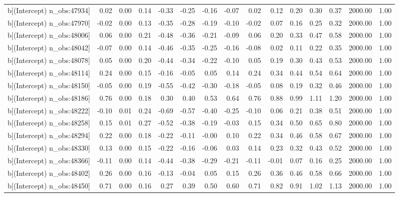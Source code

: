 \begin{table}[ht]
\begin{tabular}{rrrrrrrrrrrrrrr}
  b[(Intercept) n\_obs:47934] & 0.02 & 0.00 & 0.14 & -0.33 & -0.25 & -0.16 & -0.07 & 0.02 & 0.12 & 0.20 & 0.30 & 0.37 & 2000.00 & 1.00 \\ 
  b[(Intercept) n\_obs:47970] & -0.02 & 0.00 & 0.13 & -0.35 & -0.28 & -0.19 & -0.10 & -0.02 & 0.07 & 0.16 & 0.25 & 0.32 & 2000.00 & 1.00 \\ 
  b[(Intercept) n\_obs:48006] & 0.06 & 0.00 & 0.21 & -0.48 & -0.36 & -0.21 & -0.09 & 0.06 & 0.20 & 0.33 & 0.47 & 0.58 & 2000.00 & 1.00 \\ 
  b[(Intercept) n\_obs:48042] & -0.07 & 0.00 & 0.14 & -0.46 & -0.35 & -0.25 & -0.16 & -0.08 & 0.02 & 0.11 & 0.22 & 0.35 & 2000.00 & 1.00 \\ 
  b[(Intercept) n\_obs:48078] & 0.05 & 0.00 & 0.20 & -0.44 & -0.34 & -0.22 & -0.10 & 0.05 & 0.19 & 0.30 & 0.43 & 0.53 & 2000.00 & 1.00 \\ 
  b[(Intercept) n\_obs:48114] & 0.24 & 0.00 & 0.15 & -0.16 & -0.05 & 0.05 & 0.14 & 0.24 & 0.34 & 0.44 & 0.54 & 0.64 & 2000.00 & 1.00 \\ 
  b[(Intercept) n\_obs:48150] & -0.05 & 0.00 & 0.19 & -0.55 & -0.42 & -0.30 & -0.18 & -0.05 & 0.08 & 0.19 & 0.32 & 0.46 & 2000.00 & 1.00 \\ 
  b[(Intercept) n\_obs:48186] & 0.76 & 0.00 & 0.18 & 0.30 & 0.40 & 0.53 & 0.64 & 0.76 & 0.88 & 0.99 & 1.11 & 1.20 & 2000.00 & 1.00 \\ 
  b[(Intercept) n\_obs:48222] & -0.10 & 0.01 & 0.24 & -0.69 & -0.57 & -0.40 & -0.25 & -0.10 & 0.06 & 0.21 & 0.38 & 0.51 & 2000.00 & 1.00 \\ 
  b[(Intercept) n\_obs:48258] & 0.15 & 0.01 & 0.27 & -0.52 & -0.38 & -0.19 & -0.03 & 0.15 & 0.34 & 0.50 & 0.65 & 0.80 & 2000.00 & 1.00 \\ 
  b[(Intercept) n\_obs:48294] & 0.22 & 0.00 & 0.18 & -0.22 & -0.11 & -0.00 & 0.10 & 0.22 & 0.34 & 0.46 & 0.58 & 0.67 & 2000.00 & 1.00 \\ 
  b[(Intercept) n\_obs:48330] & 0.13 & 0.00 & 0.15 & -0.22 & -0.16 & -0.06 & 0.03 & 0.14 & 0.23 & 0.32 & 0.43 & 0.52 & 2000.00 & 1.00 \\ 
  b[(Intercept) n\_obs:48366] & -0.11 & 0.00 & 0.14 & -0.44 & -0.38 & -0.29 & -0.21 & -0.11 & -0.01 & 0.07 & 0.16 & 0.25 & 2000.00 & 1.00 \\ 
  b[(Intercept) n\_obs:48402] & 0.26 & 0.00 & 0.16 & -0.13 & -0.04 & 0.05 & 0.15 & 0.26 & 0.36 & 0.46 & 0.58 & 0.66 & 2000.00 & 1.00 \\ 
  b[(Intercept) n\_obs:48450] & 0.71 & 0.00 & 0.16 & 0.27 & 0.39 & 0.50 & 0.60 & 0.71 & 0.82 & 0.91 & 1.02 & 1.13 & 2000.00 & 1.00 \\ 

\end{tabular}
\end{table}
